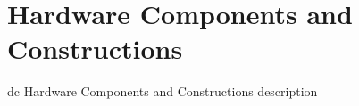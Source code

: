 \section{Hardware Components and Constructions}

dc Hardware Components and Constructions description


